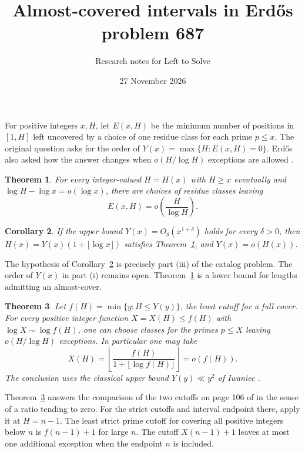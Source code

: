 \documentclass[11pt]{article}
\title{Almost-covered intervals in Erd\H{o}s problem 687}
\author{Research notes for Left to Solve}
\date{27 November 2026}
\newtheorem{theorem}{Theorem}
\newtheorem{corollary}[theorem]{Corollary}
\newcommand{\holes}{E}
\begin{document}
\maketitle

For positive integers \(x,H\), let \(\holes(x,H)\) be the minimum number of
positions in \([1,H]\) left uncovered by a choice of one residue class for
each prime \(p\le x\). The original question asks for the order of
\(Y(x)=\max\{H:\holes(x,H)=0\}\). Erd\H{o}s also asked how the answer
changes when \(o(H/\log H)\) exceptions are allowed \cite{erdos}.

\begin{theorem}\label{th:near}
For every integer-valued \(H=H(x)\) with \(H\ge x\) eventually and
\(\log H-\log x=o(\log x)\), there are choices of residue classes leaving
\[
                 \holes(x,H)=o\!\left(\frac H{\log H}\right).
\]
\end{theorem}

\begin{corollary}\label{cor:separate}
If the upper bound \(Y(x)=O_\delta(x^{1+\delta})\) holds for every
\(\delta>0\), then \(H(x)=Y(x)(1+\lfloor\log x\rfloor)\) satisfies
Theorem~\ref{th:near}, and \(Y(x)=o(H(x))\).
\end{corollary}

The hypothesis of Corollary~\ref{cor:separate} is precisely part (iii) of
the catalog problem. The order of \(Y(x)\) in part (i) remains open.
Theorem~\ref{th:near} is a lower bound for lengths admitting an almost-cover.

\begin{theorem}\label{th:inverse}
Let \(f(H)=\min\{y:H\le Y(y)\}\), the least cutoff for a full cover.
For every positive integer function \(X=X(H)\le f(H)\) with
\(\log X\sim\log f(H)\), one can choose classes for the primes
\(p\le X\) leaving \(o(H/\log H)\) exceptions. In particular one may take
\[
  X(H)=\left\lfloor\frac{f(H)}{1+\lfloor\log f(H)\rfloor}\right\rfloor
  =o(f(H)).
\]
The conclusion uses the classical upper bound \(Y(y)\ll y^2\)
of Iwaniec \cite{iwaniec,fgkmt}.
\end{theorem}

Theorem~\ref{th:inverse} answers the comparison of the two cutoffs on
page 106 of \cite{erdos} in the sense of a ratio tending to zero.
For the strict cutoffs and interval endpoint there, apply it at \(H=n-1\).
The least strict prime cutoff for covering all positive integers below
\(n\) is \(f(n-1)+1\) for large \(n\). The cutoff \(X(n-1)+1\) leaves
at most one additional exception when the endpoint \(n\) is included.
\end{document}
